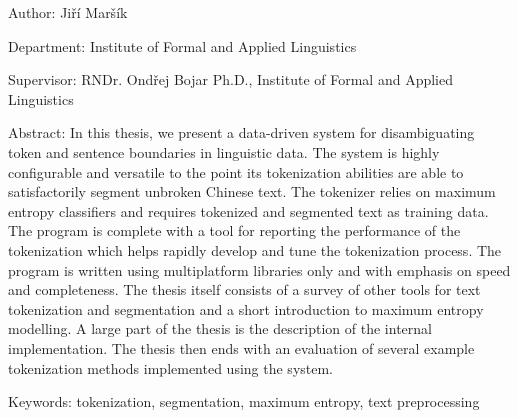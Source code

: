 {\begin{singlespace}
Author:
Jiří Maršík

Department:
Institute of Formal and Applied Linguistics

Supervisor:
RNDr. Ondřej Bojar Ph.D., Institute of Formal and Applied Linguistics

Abstract:
In this thesis, we present a data-driven system for disambiguating token and
sentence boundaries in linguistic data. The system is highly configurable and
versatile to the point its tokenization abilities are able to satisfactorily
segment unbroken Chinese text. The tokenizer relies on maximum entropy
classifiers and requires tokenized and segmented text as training data. The
program is complete with a tool for reporting the performance of the
tokenization which helps rapidly develop and tune the tokenization process. The
program is written using multiplatform libraries only and with emphasis on
speed and completeness.
The thesis itself consists of a survey of other tools for text tokenization and
segmentation and a short introduction to maximum entropy modelling. A large
part of the thesis is the description of the internal implementation. The
thesis then ends with an evaluation of several example tokenization methods
implemented using the system.

Keywords:
tokenization, segmentation, maximum entropy, text preprocessing

\end{singlespace}

\vss}

\newpage
